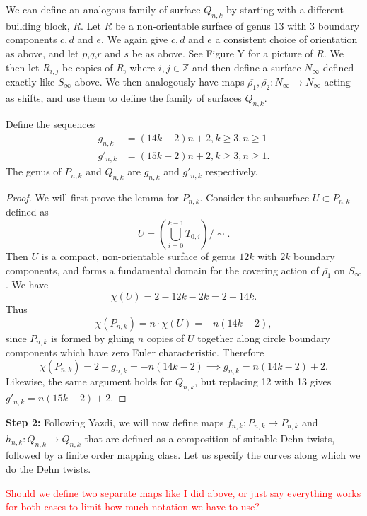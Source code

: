 We can define an analogous family of surface $Q_{n,k}$ by starting with a different building block, $R$. Let $R$ be a non-orientable surface of genus 13 with 3 boundary components $c,d$ and $e$. We again give $c, d$ and $e$ a consistent choice of orientation as above, and let $p$,$q$,$r$ and $s$ be as above. See Figure Y for a picture of $R$. We then let $R_{i,j}$ be copies of $R$, where $i,j \in \mathbb{Z}$ and then define a surface $N_\infty$ defined exactly like $S_\infty$ above. We then analogously have maps $\overline{\rho_1},\overline{\rho_2}: N_\infty \xrightarrow[]{} N_\infty$ acting as shifts, and use them to define the family of surfaces $Q_{n,k}$.

\begin{lem}
Define the sequences
\begin{align}
    g_{n,k} &= (14k - 2)n + 2, k \geq 3, n \geq 1 \\
    g'_{n,k} &= (15k - 2)n + 2, k \geq 3, n \geq 1.
\end{align}
    The genus of $P_{n,k}$ and $Q_{n,k}$ are $g_{n,k}$ and $g'_{n,k}$ respectively.
\end{lem}
\begin{proof}
    We will first prove the lemma for $P_{n,k}$. Consider the subsurface $U \subset P_{n,k}$ defined as $$U = \left( \bigcup_{i =0}^{k-1} T_{0,i} \right)/\sim.$$ Then $U$ is a compact, non-orientable surface of genus $12k$ with $2k$ boundary components, and forms a fundamental domain for the covering action of $\overline{\rho_1}$ on $S_\infty$. We have $$\chi(U) = 2 - 12k - 2k = 2 - 14k.$$ Thus $$\chi(P_{n,k}) = n \cdot \chi(U) = -n(14k - 2),$$ since $P_{n,k}$ is formed by gluing $n$ copies of $U$ together along circle boundary components which have zero Euler characteristic. Therefore $$\chi(P_{n,k}) = 2 - g_{n,k} = -n(14k - 2) \implies g_{n,k} = n(14k - 2) + 2.$$ Likewise, the same argument holds for $Q_{n,k}$, but replacing 12 with 13 gives $g'_{n,k} = n(15k - 2) + 2$.
\end{proof}

\textbf{Step 2:} Following Yazdi, we will now define maps $f_{n,k}: P_{n,k} \xrightarrow[]{} P_{n,k}$ and $h_{n,k}: Q_{n,k} \xrightarrow[]{} Q_{n,k}$ that are defined as a composition of suitable Dehn twists, followed by a finite order mapping class. Let us specify the curves along which we do the Dehn twists.

\textcolor{red}{Should we define two separate maps like I did above, or just say everything works for both cases to limit how much notation we have to use?}

